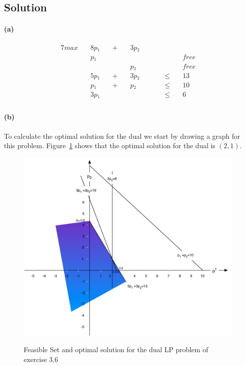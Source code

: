 \documentclass[a4paper, 12pt]{report}
\begin{document}
\subsection{Solution}

\paragraph{(a)}
\begin{alignat*}{7}
    max ~&& 8p₁ ~&& +  ~&& 3p₂ ~&&   ~&&   ~&&\\
        ~&& p₁  ~&&    ~&&     ~&&   ~&&   ~&& free\\
        ~&&     ~&&    ~&&  p₂ ~&&   ~&&   ~&& free\\
        ~&& 5p₁ ~&& +  ~&& 3p₂ ~&&   ~&& ≤ ~&& 13\\
        ~&&  p₁ ~&& +  ~&&  p₂ ~&&   ~&& ≤ ~&& 10\\
        ~&& 3p₁ ~&&    ~&&     ~&&   ~&& ≤ ~&& 6\\
\end{alignat*}

\paragraph{(b)} To calculate the optimal solution for the dual we start by
drawing a graph for this problem.
Figure~\ref{figure:Exercise_3_6_Feasible_Region_Dual} shows that the optimal
solution for the dual is $(2,1)$.\\

\begin{figure}[htbp]
    \caption{Feasible Set and optimal solution for the dual LP problem of
             exercise 3.6}
    \vskip 0.2cm
    \centering
    \includegraphics[width=\textwidth]
        {Figures/Exercise_3_6_Feasible_Region_Dual}
    \label{figure:Exercise_3_6_Feasible_Region_Dual}
\end{figure}
\end{document}
